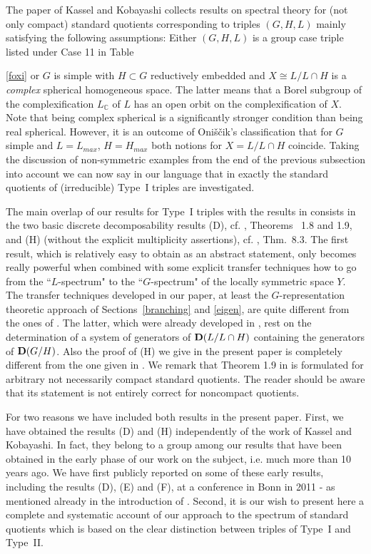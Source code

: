 \documentclass[10]{amsart}
\theoremstyle{remark}
\theoremstyle{definition}
\numberwithin{equation}{section}
\newcommand{\C}{\mathbb{C}}           %
\begin{document}
The paper \cite{KK25} of Kassel and Kobayashi collects results on spectral theory for (not only compact) standard quotients corresponding to triples $(G,H,L)$ mainly satisfying the following assumptions:
Either $(G,H,L)$ is a group case triple listed under Case 11 in Table~{\ref{foxi} or $G$ is simple with $H\subset G$ reductively embedded and $X\cong L/L\cap H$ is a {\em complex} spherical
homogeneous space. The latter means that a Borel subgroup of the complexification $L_\C$ of $L$ has an open orbit on the complexification of $X$. Note that being complex spherical
is a significantly stronger condition than being real spherical. However, it is an outcome of Oni\v s\v cik's classification that for $G$ simple and $L=L_{max}$, $H=H_{max}$ both notions
for $X=L/L\cap H$ coincide. Taking the discussion of non-symmetric examples from the end of the previous subsection into account we can now say in our language that in \cite{KK25} 
exactly the standard quotients of
(irreducible) Type~I triples are investigated.

The main overlap of our results for Type~I triples with the results in \cite{KK25} consists in the two basic discrete decomposability results (D), cf. \cite{KK25}, Theorems ~1.8 and 1.9,
and (H) (without the explicit multiplicity assertions), cf. \cite{KK25}, Thm.~8.3. The first result, which is relatively easy to obtain as an abstract statement, only becomes really powerful  when
combined with some explicit transfer techniques how to go from the ``$L$-spectrum" to the ``$G$-spectrum"  of the locally symmetric space $Y$. The transfer techniques developed
in our paper, at least the $G$-representation theoretic approach of Sections~\ref{branching} and \ref{eigen}, are quite different from the ones of \cite{KK25} . The latter, which were already developed in \cite{KK19}, rest on the determination of a system of generators of ${\bf D}(L/L\cap H)$ containing the generators of ${\bf D}(G/H)$. Also the proof of (H) we give in the present paper is completely different from the one given in \cite{KK25}. We remark that Theorem 1.9 in \cite{KK25} is formulated for arbitrary not necessarily compact standard quotients.
The reader should be aware that its statement is not entirely correct for noncompact quotients. 

For two reasons we have included both results in the present paper. First, we have obtained the results (D) and (H) independently of the work of Kassel and Kobayashi. In fact, they belong to a group among our results that have been obtained
in the early phase of our work on the subject, i.e. much more than 10 years ago. We have first publicly reported on some of these early results, including the results (D), (E) and (F), 
at a conference in Bonn in 2011 - as mentioned already in the introduction of \cite{KK19}. Second, it is our wish to present here a complete and systematic account of our approach to the spectrum of standard quotients which is based on the clear distinction
between triples of Type~I and Type~II.

}
\end{document}
